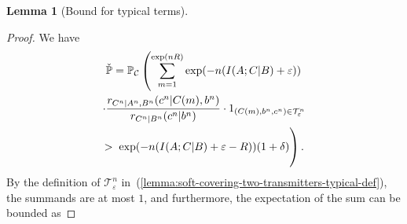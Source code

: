 \documentclass[journal]{IEEEtran}
\newcommand{\lemmaconst}{\delta}
\newcommand{\generalpmf}{r}
\newcommand{\generalrvOne}{A}
\newcommand{\generalrvOneValue}{a}
\newcommand{\generalrvTwo}{B}
\newcommand{\generalrvTwoValue}{b}
\newcommand{\generalrvThree}{C}
\newcommand{\generalrvThreeValue}{c}
\newcommand{\codebookRate}{R}
\newcommand{\codebook}{\mathcal{C}}
\newcommand{\codebookWord}[1]{C(#1)}
\newcommand{\codewordIndex}{m}
\newcommand{\codebookBlocklength}{n}
\newcommand{\mutualInformationConditional}[3]{I(#1;#2|#3)}
\newcommand{\informationDensityConditional}[3]{i({#1};{#2} | {#3})}
\newcommand{\Probability}{\mathbb{P}}
\newcommand{\indicator}[1]{1_{#1}}
\newcommand{\typicalityParam}{\varepsilon}
\newcommand{\typicalSet}[2]{\mathcal{T}_{#1}^{#2}}
\newtheorem{lemma}{Lemma}
\begin{document}
\begin{lemma}[Bound for typical terms]
\end{lemma}

\begin{proof}
We have
\begin{multline*}
\check{\Probability} =
\Probability_{\codebook}\left(
  \sum\limits_{\codewordIndex=1}^{\exp(\codebookBlocklength\codebookRate)}
  \exp(-\codebookBlocklength (\mutualInformationConditional{\generalrvOne}{\generalrvThree}{\generalrvTwo} + \typicalityParam))
  \right.
  \\
  \cdot
  \frac{\generalpmf_{\generalrvThree^\codebookBlocklength | \generalrvOne^\codebookBlocklength, \generalrvTwo^\codebookBlocklength}(\generalrvThreeValue^\codebookBlocklength | \codebookWord{\codewordIndex}, \generalrvTwoValue^\codebookBlocklength)}
       {\generalpmf_{\generalrvThree^\codebookBlocklength | \generalrvTwo^\codebookBlocklength}(\generalrvThreeValue^\codebookBlocklength | \generalrvTwoValue^\codebookBlocklength)}
  \cdot
  \indicator{(\codebookWord{\codewordIndex}, \generalrvTwoValue^\codebookBlocklength, \generalrvThreeValue^\codebookBlocklength) \in \typicalSet{\typicalityParam}{\codebookBlocklength}}
  \\
  >
  \left. \vphantom{\sum\limits_{\codewordIndex=1}^{\exp(\codebookBlocklength\codebookRate)}}
  \exp(-\codebookBlocklength (\mutualInformationConditional{\generalrvOne}{\generalrvThree}{\generalrvTwo} + \typicalityParam - \codebookRate))
  (1 + \lemmaconst)
  \right).
\end{multline*}
By the definition of $\typicalSet{\typicalityParam}{\codebookBlocklength}$ in~(\ref{lemma:soft-covering-two-transmitters-typical-def}), the summands are at most $1$, and furthermore, the expectation of the sum can be bounded as

\end{proof}
\end{document}
